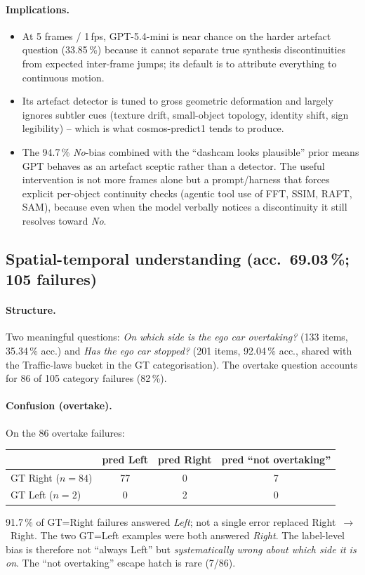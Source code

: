 \documentclass[11pt,a4paper]{article}
\newcommand{\pct}[1]{#1\,\%}
\begin{document}
\paragraph{Implications.}
\begin{itemize}
  \item At 5 frames / 1\,fps, GPT-5.4-mini is near chance on the
  harder artefact question (\pct{33.85}) because it cannot separate
  true synthesis discontinuities from expected inter-frame jumps;
  its default is to attribute everything to continuous motion.
  \item Its artefact detector is tuned to gross geometric deformation
  and largely ignores subtler cues (texture drift, small-object
  topology, identity shift, sign legibility) -- which is what
  cosmos-predict1 tends to produce.
  \item The \pct{94.7} \emph{No}-bias combined with the
  ``dashcam looks plausible'' prior means GPT behaves as an artefact
  sceptic rather than a detector. The useful intervention is not more
  frames alone but a prompt/harness that forces explicit
  per-object continuity checks (agentic tool use of FFT, SSIM, RAFT,
  SAM), because even when the model verbally notices a discontinuity
  it still resolves toward \emph{No}.
\end{itemize}

\subsection{Spatial-temporal understanding (acc.~\pct{69.03}; 105 failures)}
\label{sec:spatial}

\paragraph{Structure.} Two meaningful questions: \emph{On which side
is the ego car overtaking?} (133 items, \pct{35.34} acc.) and
\emph{Has the ego car stopped?} (201 items, \pct{92.04} acc., shared
with the Traffic-laws bucket in the GT categorisation). The overtake
question accounts for 86 of 105 category failures (\pct{82}).

\paragraph{Confusion (overtake).} On the 86 overtake failures:
\begin{center}
\begin{tabular}{l|ccc}
 & pred Left & pred Right & pred ``not overtaking'' \\
\hline
GT Right ($n=84$) & 77 & 0 & 7 \\
GT Left  ($n=2$)  & 0  & 2 & 0 \\
\end{tabular}
\end{center}
\pct{91.7} of GT=Right failures answered \emph{Left}; not a single
error replaced Right~$\to$~Right. The two GT=Left examples were
both answered \emph{Right}. The label-level bias is therefore not
``always Left'' but \emph{systematically wrong about which side it
is on}. The ``not overtaking'' escape hatch is rare (7/86).
\end{document}
